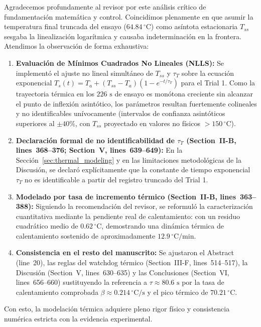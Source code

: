 \documentclass{LabDSTresponse}
\begin{document}
{Agradecemos profundamente al revisor por este análisis crítico de fundamentación matemática y control. Coincidimos plenamente en que asumir la temperatura final truncada del ensayo ($64.84\,^\circ\text{C}$) como asíntota estacionaria $T_{ss}$ sesgaba la linealización logarítmica y causaba indeterminación en la frontera. Atendimos la observación de forma exhaustiva:
\begin{enumerate}
    \item \textbf{Evaluación de Mínimos Cuadrados No Lineales (NLLS):} Se implementó el ajuste no lineal simultáneo de $T_{ss}$ y $\tau_T$ sobre la ecuación exponencial $T_s(t) = T_a + (T_{ss}-T_a)(1-e^{-t/\tau_T})$ para el Trial 1. Como la trayectoria térmica en los $226\text{ s}$ de ensayo es monótona creciente sin alcanzar el punto de inflexión asintótico, los parámetros resultan fuertemente colineales y no identificables unívocamente (intervalos de confianza asintóticos superiores al $\pm 40\%$, con $T_{ss}$ proyectado en valores no físicos $> 150\,^\circ\text{C}$).
    \item \textbf{Declaración formal de no identificabilidad de $\tau_T$ (Section~II-B, lines~368--376; Section~V, lines~639--649):} En la Sección~\ref{sec:thermal_modeling} y en las limitaciones metodológicas de la Discusión, se declaró explícitamente que la constante de tiempo exponencial $\tau_T$ no es identificable a partir del registro truncado del Trial 1.
    \item \textbf{Modelado por tasa de incremento térmico (Section~II-B, lines~363--388):} Siguiendo la recomendación del revisor, se reformuló la caracterización cuantitativa mediante la pendiente real de calentamiento:
    con un residuo cuadrático medio de $0.62\,^\circ\text{C}$, demostrando una dinámica térmica de calentamiento sostenido de aproximadamente $12.9\,^\circ\text{C/min}$.
    \item \textbf{Consistencia en el resto del manuscrito:} Se ajustaron el Abstract (line~20), las reglas del watchdog térmico (Section~III-F, lines~514--517), la Discusión (Section~V, lines~630--635) y las Conclusiones (Section~VI, lines~656--660) sustituyendo la referencia a $\tau \approx 80.6\text{ s}$ por la tasa de calentamiento comprobada $\beta \approx 0.214\,^\circ\text{C/s}$ y el pico térmico de $70.21\,^\circ\text{C}$.
\end{enumerate}
Con esto, la modelación térmica adquiere pleno rigor físico y consistencia numérica estricta con la evidencia experimental.}
\end{document}
